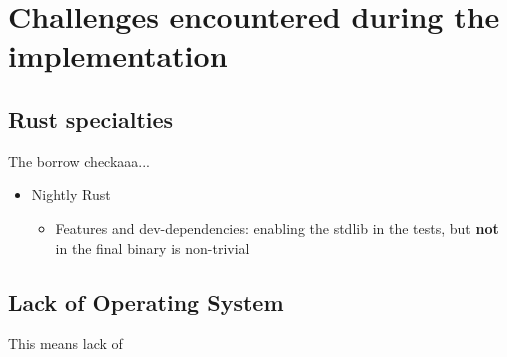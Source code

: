 \chapter{Challenges encountered during the implementation}\label{chapter:challenges}

\section{Rust specialties}
The borrow checkaaa...

\begin{itemize}
    \item Nightly Rust
    \begin{itemize}
        \item Features and dev-dependencies: enabling the stdlib in the tests, but \textbf{not} in the final binary is non-trivial
    \end{itemize}
\end{itemize}

\section{Lack of Operating System}
This means lack of

